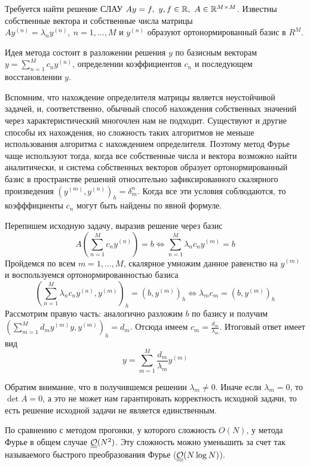 Требуется найти решение СЛАУ $Ay=f,\ y,f\in\R,\ A\in\R^{M\times M}$.
Известны собственные вектора и собственные числа матрицы $Ay^{(n)}=\lambda_ny^{(n)},\ n=1,\ldots,M$
и $y^{(n)}$ образуют ортонормированный базис в $R^M$.

Идея метода состоит в разложении решения $y$ по базисным векторам
$y=\sum_{n=1}^Mc_ny^{(n)}$, определении коэффициентов $c_n$
и последующем восстановлении $y$.

\begin{remark}
  Вспомним, что нахождение определителя матрицы является неустойчивой
  задачей, и, соответственно, обычный способ нахождения собственных
  значений через характеристический многочлен нам не подходит.
  Существуют и другие способы их нахождения, но сложность
  таких алгоритмов не меньше использования алгоритма с нахождением
  определителя. Поэтому метод Фурье чаще используют тогда,
  когда все собственные числа и вектора возможно найти аналитически,
  и система собственных векторов образует ортонормированный базис в
  пространстве решений относительно зафиксированного
  скалярного произведения $(y^{(m)},y^{(n)})_h=\delta_m^n$.
  Когда все эти условия соблюдаются, то коэфффициенты $c_n$
  могут быть найдены по явной формуле.
\end{remark}

Перепишем исходную задачу, выразив решение через базис
\[A\left(\sum_{n=1}^Mc_ny^{(n)}\right)=b\Leftrightarrow\sum_{n=1}^M\lambda_nc_ny^{(m)}=b\]
Пройдемся по всем $m=1,\ldots,M$, скалярное умножим данное равенство на $y^{(m)}$
и воспользуемся ортонормированностью базиса
\[\left(\sum_{n=1}^M\lambda_nc_ny^{(n)}, y^{(m)}\right)_h=(b,y^{(m)})_h\Leftrightarrow\lambda_mc_m=(b,y^{(m)})_h\]
Рассмотрим правую часть: аналогично разложим $b$ по базису и получим $\left(\sum_{m=1}^Md_my^{(m)}y,y^{(m)}\right)_h=d_m$.
Отсюда имеем $c_m=\frac{d_m}{\lambda_m}$. Итоговый ответ имеет вид
\[y=\sum_{m=1}^M\frac{d_m}{\lambda_m}y^{(m)}\]

\begin{remark}
  Обратим внимание, что в получившемся решении $\lambda_m\neq0$.
  Иначе если $\lambda_m=0$, то $\det{A}=0$, а это не может
  нам гарантировать корректность исходной задачи, то есть решение
  исходной задачи не является единственным.
\end{remark}

\begin{remark}
  По сравнению с методом прогонки, у которого сложность $O(N)$,
  у метода Фурье в общем случае $\underline{\underline{\mathcal{O}}}(N^2)$.
  Эту сложность можно уменьшить за счет так называемого быстрого
  преобразования Фурье ($\underline{\underline{\mathcal{O}}}(N\log{N})$).
\end{remark}

